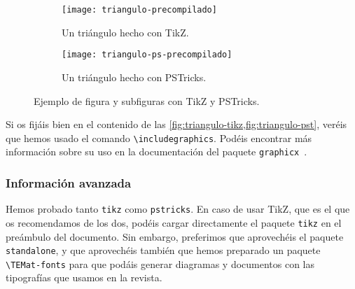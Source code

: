 \documentclass[bibtex]{TEMat-article}
\begin{document}
\begin{figure}[hbt!]
  \centering
  \begin{subfigure}[b]{0.31\textwidth}
    \texttt{[image: triangulo-precompilado]} %
    \caption{Un triángulo hecho con TikZ.}\label{fig:triangulo-tikz}
  \end{subfigure}
  \hspace{0.1\textwidth}
  \begin{subfigure}[b]{0.31\textwidth}
    \texttt{[image: triangulo-ps-precompilado]} %
    \caption{Un triángulo hecho con PSTricks.}\label{fig:triangulo-pst}
  \end{subfigure}
  \caption{Ejemplo de figura y subfiguras con TikZ y PSTricks.}\label{fig:triangulos}
\end{figure}

Si os fijáis bien en el contenido de las \cref{fig:triangulo-tikz,fig:triangulo-pst}, veréis que hemos usado el comando \verb+\includegraphics+.
Podéis encontrar más información sobre su uso en la documentación del paquete \verb+graphicx+~\cite[sec.~4]{graphics}.

\subsubsection{Información avanzada}\label{sec:diagramas:avanzado}
Hemos probado tanto \verb+tikz+ como \verb+pstricks+.
En caso de usar TikZ, que es el que os recomendamos de los dos, podéis cargar directamente el paquete \verb+tikz+ en el preámbulo del documento.
Sin embargo, preferimos que aprovechéis el paquete \verb+standalone+, y que aprovechéis también que hemos preparado un paquete \verb+\TEMat-fonts+ para que podáis generar diagramas y documentos con las tipografías que usamos en la revista.
\end{document}
